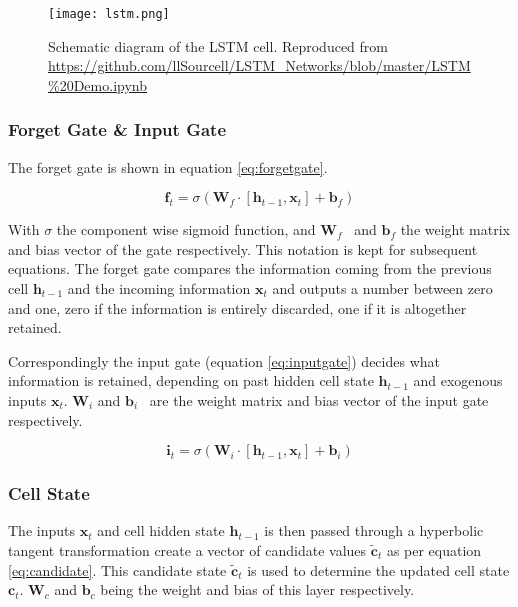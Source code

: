 \begin{figure}
	\noindent\texttt{[image: lstm.png]}
	\caption{Schematic diagram of the LSTM cell. Reproduced 
	from \url{https://github.com/llSourcell/LSTM_Networks/blob/master/LSTM\%20Demo.ipynb}}
	\label{fig:lstmcell}
\end{figure}

\subsubsection*{Forget Gate \& Input Gate}

The forget gate is shown in equation \ref{eq:forgetgate}. 

\begin{equation}\label{eq:forgetgate}
 \mathbf{f}_{t} = \sigma  \left( \mathbf{W}_f \cdot  \left[ \mathbf{h}_{t-1}, \mathbf{x}_t \right] + 
 \mathbf{b}_f \right)
\end{equation}

\vspace{\baselineskip}

With  \(  \sigma  \)  the component wise sigmoid function, and  \( \mathbf{W}_{f} \) \  and  
\( \mathbf{b}_{f} \) the weight matrix and bias vector of the gate respectively. This notation is 
kept for subsequent equations. The forget gate compares the information coming from the previous 
cell  \( \mathbf{h}_{t-1} \) and the incoming information  \( \mathbf{x}_{t} \)  and outputs a number 
between zero and one, zero if the information is entirely discarded, one if it is altogether retained.

Correspondingly the input gate (equation \ref{eq:inputgate}) decides what information is retained, depending 
on past hidden cell state $\mathbf{h}_{t-1}$ and exogenous inputs $\mathbf{x}_t$. \( \mathbf{W}_{i} \)  and  
\( \mathbf{b}_{i} \) \ are the weight matrix and bias vector of the input gate respectively.

\begin{equation}\label{eq:inputgate}
 \mathbf{i}_{t} = \sigma  \left(\mathbf{W}_{i} \cdot \left[ \mathbf{h}_{t-1}, \mathbf{x}_{t} \right] + 
 \mathbf{b}_{i} \right)
\end{equation}

\subsubsection*{Cell State}

The inputs $\mathbf{x}_t$ and cell hidden state $\mathbf{h}_{t-1}$ is then passed through a hyperbolic tangent 
transformation create a vector of candidate values \(  \tilde{\mathbf{c}}_{t} \) as per equation \ref{eq:candidate}. 
This candidate state $\tilde{\mathbf{c}}_{t}$ is used to determine the updated cell state $\mathbf{c}_{t}$. 
\( \mathbf{W}_{c} \)  and  \( \mathbf{b}_{c} \)  being the weight and bias of this layer respectively. 
 

